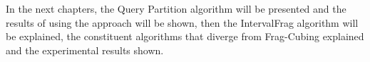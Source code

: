 In the next chapters, the Query Partition algorithm will be presented and the results of using the approach will be shown, then the IntervalFrag algorithm will be explained, the constituent algorithms that diverge from Frag-Cubing explained and the experimental results shown.


